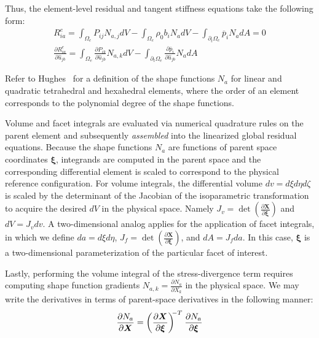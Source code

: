 Thus, the element-level residual and tangent stiffness equations take the following form:
\begin{gather}
R^e_{ia} = \int_{\Omega_e}P_{ij}N_{a,j}dV - \int_{\Omega_e}\rho_0b_iN_adV - \int_{\partial_t\Omega_e} \overline{p}_iN_adA = 0 \label{eqn:elr} \\[0.7em]
\frac{\partial R^e_{ia}}{\partial \hat{u}_{jb}} = \int_{\Omega_e}\frac{\partial P_{ik}}{\partial \hat{u}_{jb}}N_{a,k}dV - \int_{\partial_t\Omega_e}\frac{\partial \overline{p}_i}{\partial \hat{u}_{jb}}N_adA \label{eqn:elt}
\end{gather}

Refer to Hughes~\cite{hughes_2007} for a definition of the shape functions $N_a$ for linear and quadratic tetrahedral and hexahedral elements, where the order of an element corresponds to the polynomial degree of the shape functions.

Volume and facet integrals are evaluated via numerical quadrature rules on the parent element and subsequently \textit{assembled} into the linearized global residual equations. Because the shape functions $N_a$ are functions of parent space coordinates $\bm{\xi}$, integrands are computed in the parent space and the corresponding differential element is scaled to correspond to the physical reference configuration. For volume integrals, the differential volume $dv = {d\xi}{d\eta}{d\zeta}$ is scaled by the determinant of the Jacobian of the isoparametric transformation to acquire the desired $dV$ in the physical space. Namely $J_v = \det(\frac{\partial{\bm{X}}}{\partial\bm{\xi}})$ and $dV = J_vdv$. A two-dimensional analog applies for the application of facet integrals, in which we define $da = {d\xi}{d\eta}$, $J_f = \det(\frac{\partial{\bm{X}}}{\partial\bm{\xi}})$, and $dA = J_fda$. In this case, $\bm{\xi}$ is a two-dimensional parameterization of the particular facet of interest.

Lastly, performing the volume integral of the stress-divergence term requires computing shape function gradients $N_{a,k} = \frac{\partial N_a}{\partial X_k}$ in the physical space. We may write the derivatives in terms of parent-space derivatives in the following manner:
\begin{equation}
\frac{\partial N_a}{\partial \bm{X}} = \left(\frac{\partial \bm{X}}{\partial \bm{\xi}}\right)^{\hspace{-0.3em}-T} \hspace{0.05em} \frac{\partial N_a}{\partial \bm{\xi}}
\end{equation}

